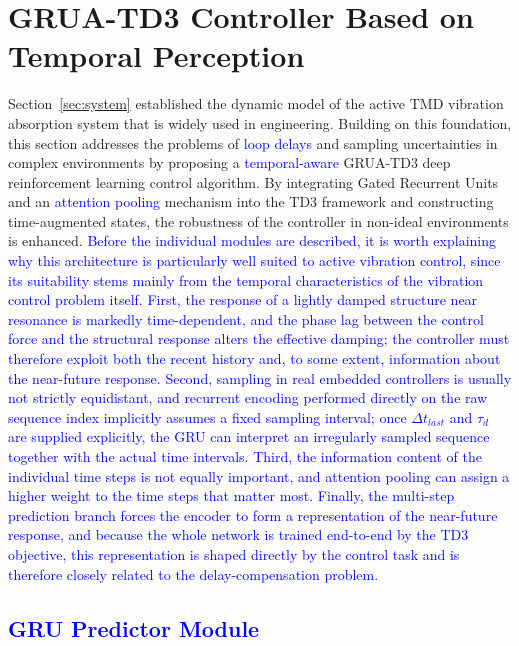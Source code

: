 \documentclass[review]{elsarticle}
\begin{document}
\section{GRUA-TD3 Controller Based on Temporal Perception}
\label{sec:controller}

Section~\ref{sec:system} established the dynamic model of the active TMD vibration absorption system that is widely used in engineering.
Building on this foundation, this section addresses the problems of \textcolor{blue}{loop delays} and sampling uncertainties in complex environments by proposing a \textcolor{blue}{temporal-aware} GRUA-TD3 deep reinforcement learning control algorithm.
By integrating Gated Recurrent Units and an \textcolor{blue}{attention pooling} mechanism into the TD3 framework and constructing time-augmented states, the robustness of the controller in non-ideal environments is enhanced.
\textcolor{blue}{Before the individual modules are described, it is worth explaining why this architecture is particularly well suited to active vibration control, since its suitability stems mainly from the temporal characteristics of the vibration control problem itself. First, the response of a lightly damped structure near resonance is markedly time-dependent, and the phase lag between the control force and the structural response alters the effective damping; the controller must therefore exploit both the recent history and, to some extent, information about the near-future response. Second, sampling in real embedded controllers is usually not strictly equidistant, and recurrent encoding performed directly on the raw sequence index implicitly assumes a fixed sampling interval; once $\Delta t_{last}$ and $\tau_{d}$ are supplied explicitly, the GRU can interpret an irregularly sampled sequence together with the actual time intervals. Third, the information content of the individual time steps is not equally important, and attention pooling can assign a higher weight to the time steps that matter most. Finally, the multi-step prediction branch forces the encoder to form a representation of the near-future response, and because the whole network is trained end-to-end by the TD3 objective, this representation is shaped directly by the control task and is therefore closely related to the delay-compensation problem.}

\subsection{\textcolor{blue}{GRU Predictor Module}}
\end{document}
